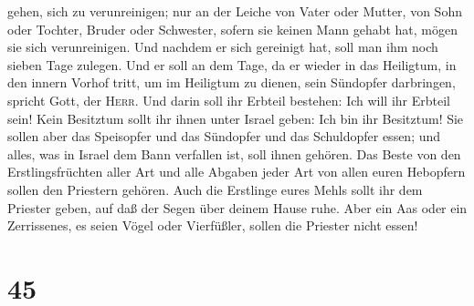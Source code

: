 gehen, sich zu verunreinigen; nur an der Leiche von Vater oder Mutter,
von Sohn oder Tochter, Bruder oder Schwester, sofern sie keinen Mann
gehabt hat, mögen sie sich verunreinigen.  Und nachdem er
sich gereinigt hat, soll man ihm noch sieben Tage zulegen.
 Und er soll an dem Tage, da er wieder in das Heiligtum,
in den innern Vorhof tritt, um im Heiligtum zu dienen, sein Sündopfer
darbringen, spricht Gott, der \textsc{Herr}.  Und darin
soll ihr Erbteil bestehen: Ich will ihr Erbteil sein! Kein Besitztum
sollt ihr ihnen unter Israel geben: Ich bin ihr Besitztum!
 Sie sollen aber das Speisopfer und das Sündopfer und das
Schuldopfer essen; und alles, was in Israel dem Bann verfallen ist, soll
ihnen gehören.  Das Beste von den Erstlingsfrüchten aller
Art und alle Abgaben jeder Art von allen euren Hebopfern sollen den
Priestern gehören. Auch die Erstlinge eures Mehls sollt ihr dem Priester
geben, auf daß der Segen über deinem Hause ruhe.  Aber
ein Aas oder ein Zerrissenes, es seien Vögel oder Vierfüßler, sollen die
Priester nicht essen!

\hypertarget{section-44}{%
\section{45}\label{section-44}}

